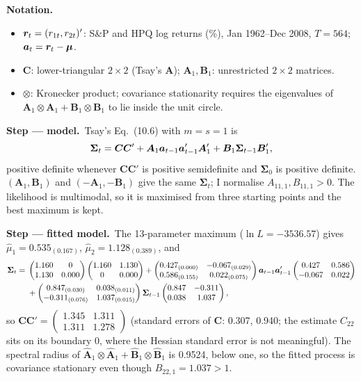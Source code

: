 \documentclass[11pt,a4paper]{article}
\newenvironment{notacao}{\par\smallskip\noindent\textbf{Notation.}\begin{itemize}[leftmargin=1.4em,topsep=1pt,itemsep=0pt]\small}{\end{itemize}}
\newcommand{\passo}[2]{\par\smallskip\noindent\textbf{Step --- #1.}~#2}
\newcommand{\bmu}{\bm{\mu}}\newcommand{\bphi}{\bm{\phi}}\newcommand{\bSigma}{\bm{\Sigma}}
\begin{document}
\begin{sol}
\begin{notacao}
\item $\bm{r}_t=(r_{1t},r_{2t})'$: S\&P and HPQ log returns (\%), Jan 1962--Dec 2008, $T=564$; $\ba_t=\br_t-\bmu$.
\item $\bm C$: lower-triangular $2\times2$ (Tsay's $\bm A$); $\bm A_1,\bm B_1$: unrestricted $2\times2$ matrices.
\item $\otimes$: Kronecker product; covariance stationarity requires the eigenvalues of
$\bm A_1\otimes\bm A_1+\bm B_1\otimes\bm B_1$ to lie inside the unit circle.
\end{notacao}

\passo{model}{Tsay's Eq.~(10.6) with $m=s=1$ is
\begin{equation}
\bSigma_t=\bm C\bm C'+\bm A_1\ba_{t-1}\ba_{t-1}'\bm A_1'+\bm B_1\bSigma_{t-1}\bm B_1',\label{eq:q8bekk}
\end{equation}
positive definite whenever $\bm C\bm C'$ is positive semidefinite and $\bSigma_0$ is positive definite.
$(\bm A_1,\bm B_1)$ and $(-\bm A_1,-\bm B_1)$ give the same $\bSigma_t$; I normalise $A_{11,1},B_{11,1}>0$.
The likelihood is multimodal, so it is maximised from three starting points and the best maximum is kept.}

\passo{fitted model}{The 13-parameter maximum ($\ln L=-3536.57$) gives $\hat\mu_1=0.535_{(0.167)}$, $\hat\mu_2=1.128_{(0.389)}$, and
\begin{align}
\bSigma_t={}&\begin{pmatrix}1.160&0\\1.130&0.000\end{pmatrix}\begin{pmatrix}1.160&1.130\\0&0.000\end{pmatrix}
+\begin{pmatrix}0.427_{(0.060)}&-0.067_{(0.029)}\\0.586_{(0.155)}&0.022_{(0.075)}\end{pmatrix}\ba_{t-1}\ba_{t-1}'
\begin{pmatrix}0.427&0.586\\-0.067&0.022\end{pmatrix}\nonumber\\
&+\begin{pmatrix}0.847_{(0.030)}&0.038_{(0.011)}\\-0.311_{(0.076)}&1.037_{(0.015)}\end{pmatrix}\bSigma_{t-1}
\begin{pmatrix}0.847&-0.311\\0.038&1.037\end{pmatrix},\nonumber
\end{align}
so $\bm C\bm C'=\begin{pmatrix}1.345&1.311\\1.311&1.278\end{pmatrix}$ (standard errors of $\bm C$:
0.307, 0.940; the estimate $C_{22}$ sits on its boundary 0, where the Hessian standard error is not meaningful).
The spectral radius of $\hat{\bm A}_1\otimes\hat{\bm A}_1+\hat{\bm B}_1\otimes\hat{\bm B}_1$ is 0.9524,
below one, so the fitted process is covariance stationary even though $B_{22,1}=1.037>1$.}


\end{sol}
\end{document}
